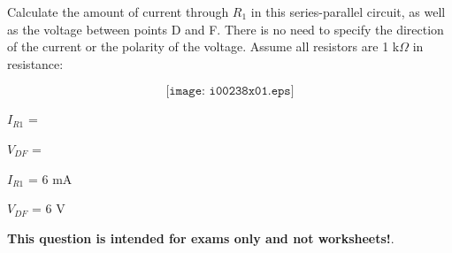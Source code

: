 

Calculate the amount of current through $R_1$ in this series-parallel circuit, as well as the voltage between points D and F.  There is no need to specify the direction of the current or the polarity of the voltage.  Assume all resistors are 1 k$\Omega$ in resistance:

$$\texttt{[image: i00238x01.eps]}$$

$I_{R1}$ = 

\vskip 10pt

$V_{DF}$ = 

\vskip 10pt







$I_{R1}$ = 6 mA

\vskip 10pt

$V_{DF}$ = 6 V







{\bf This question is intended for exams only and not worksheets!}.


